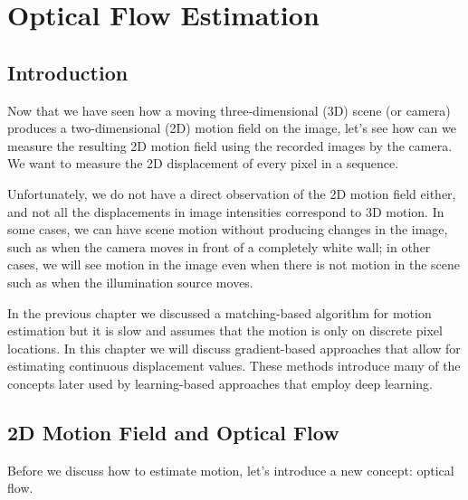 

\chapter{Optical Flow Estimation}
\label{chap:optical_flow_estimation}


\section{Introduction}

Now that we have seen how a moving three-dimensional (3D) scene (or camera) produces a two-dimensional (2D) motion field on the image, let's see how can we measure the resulting 2D motion field using the recorded images by the camera. We want to measure the 2D displacement of every pixel in a sequence.


Unfortunately, we do not have a direct observation of the 2D motion field either, and not all the displacements in image intensities correspond to 3D motion. In some cases, we can have scene motion without producing changes in the image, such as when the camera moves in front of a completely white wall; in other cases, we will see motion in the image even when there is not motion in the scene such as when the illumination source moves.

In the previous chapter we discussed a matching-based algorithm for motion estimation but it is slow and assumes that the motion is only on discrete pixel locations. In this chapter we will discuss gradient-based approaches that allow for estimating continuous displacement values. These methods introduce many of the concepts later used by learning-based approaches that employ deep learning.


\section{2D Motion Field and Optical Flow}

Before we discuss how to estimate motion, let's introduce a new concept: optical flow. 

